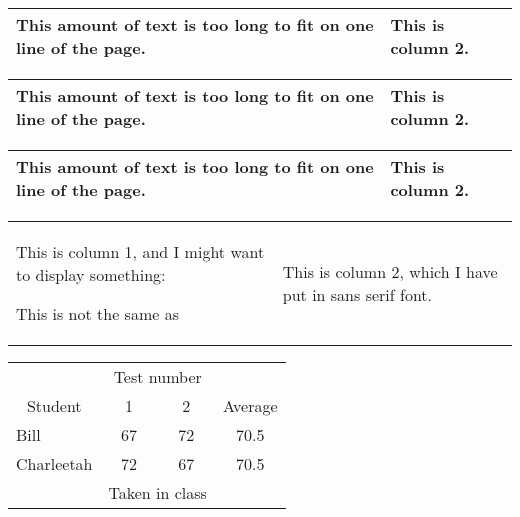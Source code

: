 \documentclass[12pt]{article}
\begin{document}
\bigskip
\begin{tabular}{|p{2in}|l|} \hline
	This amount of text is too long to fit on one line of the page.
	& This is column 2. \\ \hline
\end{tabular}

\bigskip
\begin{tabular}{|l|l|} \hline
	\parbox{2in}{This amount of text is too long to fit on
		one line of the page.} & This is column 2. \\ \hline
\end{tabular}

\bigskip
\begin{tabular}{|l|l|} \hline
	\parbox[t]{2in}{This amount of text is too long to fit on
		one line of the page.} & This is column 2. \\ \hline
\end{tabular}

\bigskip
\begin{center}
	\begin{tabular}{ll}
		\parbox[t]{3in}{\begin{flushleft}
				This is column 1, and I might want to display something:

				\medskip\centerline{}\medskip

				This is not the same as

				\medskip{}
							\end{flushleft} }
		& \parbox[t]{1in}{\begin{flushleft}\textsf{This is column 2,
					which I have put in sans serif font.}
							\end{flushleft} }
	\end{tabular}
\end{center}

\begin{center}
	\begin{tabular}{l|cc|c}
		& \multicolumn{2}{|c|}{Test number} \\
		\multicolumn{1}{c|}{Student} &
		1
		&
		2
		& Average \\ \hline
		Bill
		&
		67
		&
		72
		&
		70.5 \\
		Charleetah
		&
		72
		&
		67
		&
		70.5 \\ \hline
		& \multicolumn{2}{c}{Taken in class}
		\\ \cline{2-3}
	\end{tabular}
\end{center}
\end{document}
